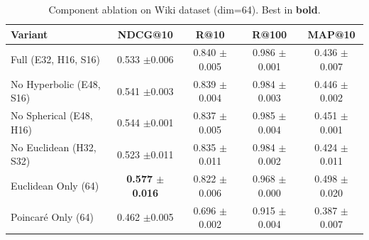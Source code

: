 \begin{table}[t]
\caption{Component ablation on Wiki dataset (dim=64). Best in \textbf{bold}.}
\label{tab:ablation_components}
\centering
\small
\begin{tabular}{lcccc}
\toprule
Variant & NDCG@10 & R@10 & R@100 & MAP@10 \\
\midrule
Full (E32, H16, S16) & 0.533 {\scriptsize$\pm$0.006} & 0.840 {\scriptsize$\pm$0.005} & 0.986 {\scriptsize$\pm$0.001} & 0.436 {\scriptsize$\pm$0.007} \\
No Hyperbolic (E48, S16) & 0.541 {\scriptsize$\pm$0.003} & 0.839 {\scriptsize$\pm$0.004} & 0.984 {\scriptsize$\pm$0.003} & 0.446 {\scriptsize$\pm$0.002} \\
No Spherical (E48, H16) & 0.544 {\scriptsize$\pm$0.001} & 0.837 {\scriptsize$\pm$0.005} & 0.985 {\scriptsize$\pm$0.004} & 0.451 {\scriptsize$\pm$0.001} \\
No Euclidean (H32, S32) & 0.523 {\scriptsize$\pm$0.011} & 0.835 {\scriptsize$\pm$0.011} & 0.984 {\scriptsize$\pm$0.002} & 0.424 {\scriptsize$\pm$0.011} \\
Euclidean Only (64) & \textbf{0.577 {\scriptsize$\pm$0.016}} & 0.822 {\scriptsize$\pm$0.006} & 0.968 {\scriptsize$\pm$0.000} & 0.498 {\scriptsize$\pm$0.020} \\
Poincar\'e Only (64) & 0.462 {\scriptsize$\pm$0.005} & 0.696 {\scriptsize$\pm$0.002} & 0.915 {\scriptsize$\pm$0.004} & 0.387 {\scriptsize$\pm$0.007} \\
\bottomrule
\end{tabular}
\end{table}